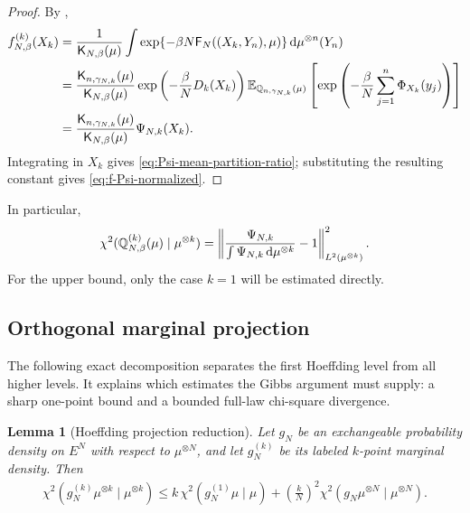 \documentclass[11pt,reqno]{amsart}
\numberwithin{equation}{section}
\theoremstyle{plain}
\newtheorem{lemma}[lemma]{Lemma}
\theoremstyle{remark}
\DeclarePairedDelimiter{\pa}{\lparen}{\rparen}
\newcommand{\md}{\mathrm{d}}
\newcommand{\E}{{\mathbb{E}}}
\newcommand{\Q}{{\mathbb{Q}}}
\newcommand{\K}{{\mathsf{K}}}
\newcommand{\Fr}{{\mathsf{F}}}
\newcommand{\Xk}{X_k}
\newcommand{\be}{\beta}
\newcommand{\Chi}{\chi^2}
\begin{document}
\begin{proof}
By ,
\begin{align}
f_{N,\be}^{(k)}(\Xk)
&=\frac1{\K_{N,\be}(\mu)}
\int \exp\{-\be N\Fr_N((\Xk,Y_n),\mu)\}\,\md\mu^{\otimes n}(Y_n)\notag\\
&=\frac{\K_{n,\gamma_{N,k}}(\mu)}{\K_{N,\be}(\mu)}
\exp\left(-\frac{\be}{N}D_k(\Xk)\right)
\E_{\Q_{n,\gamma_{N,k}}(\mu)}
\left[\exp\left(-\frac{\be}{N}\sum_{j=1}^n\Phi_{\Xk}(y_j)\right)\right]\notag\\
&=\frac{\K_{n,\gamma_{N,k}}(\mu)}{\K_{N,\be}(\mu)}\Psi_{N,k}(\Xk).
\end{align}
Integrating in \(\Xk\) gives \eqref{eq:Psi-mean-partition-ratio}; substituting the resulting constant gives \eqref{eq:f-Psi-normalized}.
\end{proof}

In particular,
\begin{align}\label{eq:chi2-Psi}
 \Chi\pa{\Q_{N,\be}^{(k)}(\mu)\mid\mu^{\otimes k}}
 =\left\|\frac{\Psi_{N,k}}{\int\Psi_{N,k}\,\md\mu^{\otimes k}}-1\right\|_{L^2(\mu^{\otimes k})}^2.
\end{align}
For the upper bound, only the case \(k=1\) will be estimated directly.

\subsection{Orthogonal marginal projection}
\label{subsec:Hilbertian-all-marginal-reduction}

The following exact decomposition separates the first Hoeffding level from all higher levels.  It explains which estimates the Gibbs argument must supply: a sharp one-point bound and a bounded full-law chi-square divergence.

\begin{lemma}[Hoeffding projection reduction]\label{lem:hoeffding-reduction}
Let \(g_N\) be an exchangeable probability density on \(E^N\) with respect to \(\mu^{\otimes N}\), and let \(g_N^{(k)}\) be its labeled \(k\)-point marginal density.  Then
\begin{align}\label{eq:hoeffding-chi2-bound}
 \Chi(g_N^{(k)}\mu^{\otimes k}\mid\mu^{\otimes k})
 \le k\,\Chi(g_N^{(1)}\mu\mid\mu)
 +\left(\frac{k}{N}\right)^2\Chi(g_N\mu^{\otimes N}\mid\mu^{\otimes N}).
\end{align}
\end{lemma}
\end{document}
